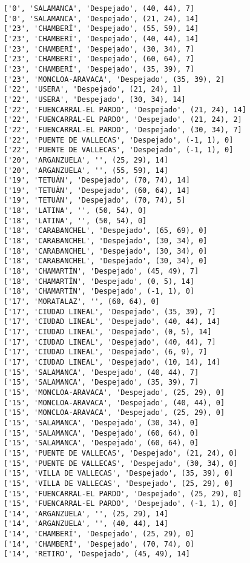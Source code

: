 \documentclass[11pt]{article}
\begin{document}
\begin{Verbatim}[commandchars=\\\{\}]
['0', 'SALAMANCA', 'Despejado', (40, 44), 7]
['0', 'SALAMANCA', 'Despejado', (21, 24), 14]
['23', 'CHAMBERÍ', 'Despejado', (55, 59), 14]
['23', 'CHAMBERÍ', 'Despejado', (40, 44), 14]
['23', 'CHAMBERÍ', 'Despejado', (30, 34), 7]
['23', 'CHAMBERÍ', 'Despejado', (60, 64), 7]
['23', 'CHAMBERÍ', 'Despejado', (35, 39), 7]
['23', 'MONCLOA-ARAVACA', 'Despejado', (35, 39), 2]
['22', 'USERA', 'Despejado', (21, 24), 1]
['22', 'USERA', 'Despejado', (30, 34), 14]
['22', 'FUENCARRAL-EL PARDO', 'Despejado', (21, 24), 14]
['22', 'FUENCARRAL-EL PARDO', 'Despejado', (21, 24), 2]
['22', 'FUENCARRAL-EL PARDO', 'Despejado', (30, 34), 7]
['22', 'PUENTE DE VALLECAS', 'Despejado', (-1, 1), 0]
['22', 'PUENTE DE VALLECAS', 'Despejado', (-1, 1), 0]
['20', 'ARGANZUELA', '', (25, 29), 14]
['20', 'ARGANZUELA', '', (55, 59), 14]
['19', 'TETUÁN', 'Despejado', (70, 74), 14]
['19', 'TETUÁN', 'Despejado', (60, 64), 14]
['19', 'TETUÁN', 'Despejado', (70, 74), 5]
['18', 'LATINA', '', (50, 54), 0]
['18', 'LATINA', '', (50, 54), 0]
['18', 'CARABANCHEL', 'Despejado', (65, 69), 0]
['18', 'CARABANCHEL', 'Despejado', (30, 34), 0]
['18', 'CARABANCHEL', 'Despejado', (30, 34), 0]
['18', 'CARABANCHEL', 'Despejado', (30, 34), 0]
['18', 'CHAMARTÍN', 'Despejado', (45, 49), 7]
['18', 'CHAMARTÍN', 'Despejado', (0, 5), 14]
['18', 'CHAMARTÍN', 'Despejado', (-1, 1), 0]
['17', 'MORATALAZ', '', (60, 64), 0]
['17', 'CIUDAD LINEAL', 'Despejado', (35, 39), 7]
['17', 'CIUDAD LINEAL', 'Despejado', (40, 44), 14]
['17', 'CIUDAD LINEAL', 'Despejado', (0, 5), 14]
['17', 'CIUDAD LINEAL', 'Despejado', (40, 44), 7]
['17', 'CIUDAD LINEAL', 'Despejado', (6, 9), 7]
['17', 'CIUDAD LINEAL', 'Despejado', (10, 14), 14]
['15', 'SALAMANCA', 'Despejado', (40, 44), 7]
['15', 'SALAMANCA', 'Despejado', (35, 39), 7]
['15', 'MONCLOA-ARAVACA', 'Despejado', (25, 29), 0]
['15', 'MONCLOA-ARAVACA', 'Despejado', (40, 44), 0]
['15', 'MONCLOA-ARAVACA', 'Despejado', (25, 29), 0]
['15', 'SALAMANCA', 'Despejado', (30, 34), 0]
['15', 'SALAMANCA', 'Despejado', (60, 64), 0]
['15', 'SALAMANCA', 'Despejado', (60, 64), 0]
['15', 'PUENTE DE VALLECAS', 'Despejado', (21, 24), 0]
['15', 'PUENTE DE VALLECAS', 'Despejado', (30, 34), 0]
['15', 'VILLA DE VALLECAS', 'Despejado', (35, 39), 0]
['15', 'VILLA DE VALLECAS', 'Despejado', (25, 29), 0]
['15', 'FUENCARRAL-EL PARDO', 'Despejado', (25, 29), 0]
['15', 'FUENCARRAL-EL PARDO', 'Despejado', (-1, 1), 0]
['14', 'ARGANZUELA', '', (25, 29), 14]
['14', 'ARGANZUELA', '', (40, 44), 14]
['14', 'CHAMBERÍ', 'Despejado', (25, 29), 0]
['14', 'CHAMBERÍ', 'Despejado', (70, 74), 0]
['14', 'RETIRO', 'Despejado', (45, 49), 14]

\end{Verbatim}
\end{document}
